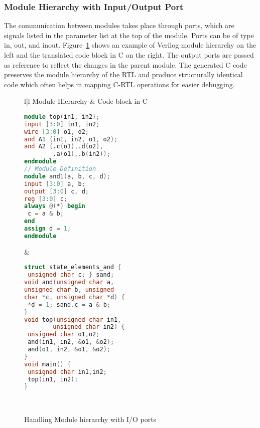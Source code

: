 \subsubsection{Module Hierarchy with Input/Output Port}
The communication between modules takes place through 
ports, which are signals listed in the parameter list at the 
top of the module. Ports can be of type in, out, and inout. 
Figure~\ref{figure:module-hierarchy} shows an example of 
Verilog module hierarchy on the left and the translated 
code block in C on the right. The output ports are passed 
as reference to reflect the changes in the parent module.
The generated C code preserves the module hierarchy of 
the RTL and produce structurally identical code which 
often helps in mapping C-RTL operations for easier debugging. 

\begin{figure}[htbp]
\scriptsize
\centering
\begin{tabular}{l|l}
\hline
Module Hierarchy &  Code block in C \\
\hline
\begin{lstlisting}[mathescape=true,language=Verilog]
module top(in1, in2);
input [3:0] in1, in2;
wire [3:0] o1, o2;
and A1 (in1, in2, o1, o2);
and A2 (.c(o1),.d(o2),
        .a(o1),.b(in2));
endmodule
// Module Definition              
module and1(a, b, c, d);
input [3:0] a, b;
output [3:0] c, d;
reg [3:0] c;
always @(*) begin
 c = a & b;
end
assign d = 1;
endmodule
\end{lstlisting}
&
\begin{lstlisting}[mathescape=true,language=C]
struct state_elements_and {
 unsigned char c; } sand;
void and(unsigned char a, 
unsigned char b, unsigned 
char *c, unsigned char *d) {
 *d = 1; sand.c = a & b;
}
void top(unsigned char in1, 
        unsigned char in2) {
 unsigned char o1,o2;
 and(in1, in2, &o1, &o2);
 and(o1, in2, &o1, &o2);
}
void main() {
 unsigned char in1,in2;
 top(in1, in2);
}    
\end{lstlisting}
\\
\hline
\end{tabular}
\caption{Handling Module hierarchy with I/O ports}
\label{figure:module-hierarchy}
\end{figure}

